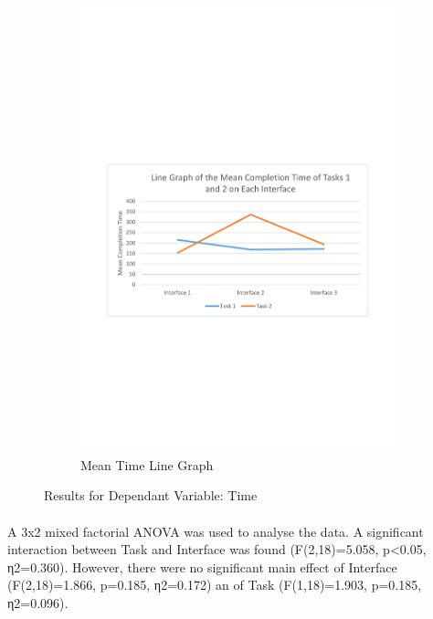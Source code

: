 \documentclass{l4proj}
\begin{document}
\begin{figure}[H]
\begin{subfigure}{.5\textwidth}
		\includegraphics[width=\textwidth]{charts/table2.pdf}
		\caption{Mean Time Line Graph}
		\label{ch:meantimelinegraph}
	\end{subfigure}
	\caption{Results for Dependant Variable: Time}
	\label{fig:time}
\end{figure}

\paragraph{}
A 3x2 mixed factorial ANOVA was used to analyse the data. A significant interaction between Task and Interface was found (F(2,18)=5.058, p<0.05, η2=0.360). However, there were no significant main effect of Interface (F(2,18)=1.866, p=0.185, η2=0.172) an of Task (F(1,18)=1.903, p=0.185, η2=0.096). 
\end{document}
